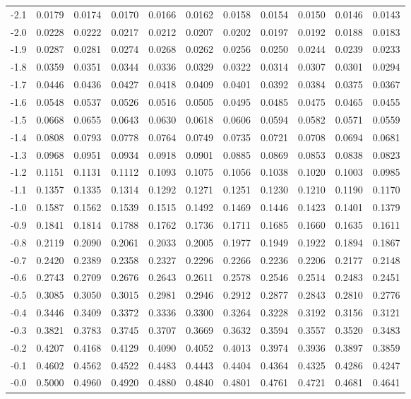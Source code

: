 \begin{frame}
{\begin{tabular}{l|llllllllll}
-2.1 & 0.0179 & 0.0174 & 0.0170 & 0.0166 & 0.0162 & 0.0158 & 0.0154 & 0.0150 & 0.0146 & 0.0143 \\ 
-2.0 & 0.0228 & 0.0222 & 0.0217 & 0.0212 & 0.0207 & 0.0202 & 0.0197 & 0.0192 & 0.0188 & 0.0183 \\ 
-1.9 & 0.0287 & 0.0281 & 0.0274 & 0.0268 & 0.0262 & 0.0256 & 0.0250 & 0.0244 & 0.0239 & 0.0233 \\ 
-1.8 & 0.0359 & 0.0351 & 0.0344 & 0.0336 & 0.0329 & 0.0322 & 0.0314 & 0.0307 & 0.0301 & 0.0294 \\ 
-1.7 & 0.0446 & 0.0436 & 0.0427 & 0.0418 & 0.0409 & 0.0401 & 0.0392 & 0.0384 & 0.0375 & 0.0367 \\ 
-1.6 & 0.0548 & 0.0537 & 0.0526 & 0.0516 & 0.0505 & 0.0495 & 0.0485 & 0.0475 & 0.0465 & 0.0455 \\ 
-1.5 & 0.0668 & 0.0655 & 0.0643 & 0.0630 & 0.0618 & 0.0606 & 0.0594 & 0.0582 & 0.0571 & 0.0559 \\ 
-1.4 & 0.0808 & 0.0793 & 0.0778 & 0.0764 & 0.0749 & 0.0735 & 0.0721 & 0.0708 & 0.0694 & 0.0681 \\ 
-1.3 & 0.0968 & 0.0951 & 0.0934 & 0.0918 & 0.0901 & 0.0885 & 0.0869 & 0.0853 & 0.0838 & 0.0823 \\ 
-1.2 & 0.1151 & 0.1131 & 0.1112 & 0.1093 & 0.1075 & 0.1056 & 0.1038 & 0.1020 & 0.1003 & 0.0985 \\ 
-1.1 & 0.1357 & 0.1335 & 0.1314 & 0.1292 & 0.1271 & 0.1251 & 0.1230 & 0.1210 & 0.1190 & 0.1170 \\ 
-1.0 & 0.1587 & 0.1562 & 0.1539 & 0.1515 & 0.1492 & 0.1469 & 0.1446 & 0.1423 & 0.1401 & 0.1379 \\ 
-0.9 & 0.1841 & 0.1814 & 0.1788 & 0.1762 & 0.1736 & 0.1711 & 0.1685 & 0.1660 & 0.1635 & 0.1611 \\ 
-0.8 & 0.2119 & 0.2090 & 0.2061 & 0.2033 & 0.2005 & 0.1977 & 0.1949 & 0.1922 & 0.1894 & 0.1867 \\ 
-0.7 & 0.2420 & 0.2389 & 0.2358 & 0.2327 & 0.2296 & 0.2266 & 0.2236 & 0.2206 & 0.2177 & 0.2148 \\ 
-0.6 & 0.2743 & 0.2709 & 0.2676 & 0.2643 & 0.2611 & 0.2578 & 0.2546 & 0.2514 & 0.2483 & 0.2451 \\ 
-0.5 & 0.3085 & 0.3050 & 0.3015 & 0.2981 & 0.2946 & 0.2912 & 0.2877 & 0.2843 & 0.2810 & 0.2776 \\ 
-0.4 & 0.3446 & 0.3409 & 0.3372 & 0.3336 & 0.3300 & 0.3264 & 0.3228 & 0.3192 & 0.3156 & 0.3121 \\ 
-0.3 & 0.3821 & 0.3783 & 0.3745 & 0.3707 & 0.3669 & 0.3632 & 0.3594 & 0.3557 & 0.3520 & 0.3483 \\ 
-0.2 & 0.4207 & 0.4168 & 0.4129 & 0.4090 & 0.4052 & 0.4013 & 0.3974 & 0.3936 & 0.3897 & 0.3859 \\ 
-0.1 & 0.4602 & 0.4562 & 0.4522 & 0.4483 & 0.4443 & 0.4404 & 0.4364 & 0.4325 & 0.4286 & 0.4247 \\ 
-0.0 & 0.5000 & 0.4960 & 0.4920 & 0.4880 & 0.4840 & 0.4801 & 0.4761 & 0.4721 & 0.4681 & 0.4641 
\end{tabular}
}
\end{frame}

